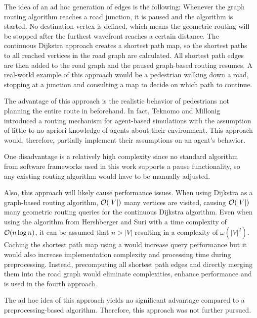 		The idea of an ad hoc generation of edges is the following:
		Whenever the graph routing algorithm reaches a road junction, it is paused and the  algorithm is started.
		No destination vertex is defined, which means the geometric routing will be stopped after the furthest wavefront reaches a certain distance.
		The continuous Dijkstra approach creates a shortest path map, so the shortest paths to all reached vertices in the road graph are calculated.
		All shortest path edges are then added to the road graph and the paused graph-based routing resumes.
		A real-world example of this approach would be a pedestrian walking down a road, stopping at a junction and consulting a map to decide on which path to continue.
		
		The advantage of this approach is the realistic behavior of pedestrians not planning the entire route in beforehand.
		In fact, Teknomo and Millonig introduced a routing mechanism for agent-based simulations with the assumption of little to no apriori knowledge of agents about their environment\cite{teknomo-millonig-routing}.
		This approach would, therefore, partially implement their assumptions on an agent's behavior.
		
		One disadvantage is a relatively high complexity since no standard algorithm from software frameworks used in this work supports a pause functionality, so any existing routing algorithm would have to be manually adjusted.

		Also, this approach will likely cause performance issues.
		When using Dijkstra as a graph-based routing algorithm, $\mathcal{O}(|V|)$ many vertices are visited, causing $\mathcal{O}(|V|)$ many geometric routing queries for the continuous Dijkstra algorithm.
		Even when using the algorithm from Hershberger and Suri\cite{hershberger-suri} with a time complexity of $\mathcal{O}(n \log n)$, it can be assumed that $n > |V|$ resulting in a complexity of $\omega(|V|^2)$.
		Caching the shortest path map using a  would increase query performance but it would also increase implementation complexity and processing time during preprocessing.
		Instead, precomputing all shortest path edges and directly merging them into the road graph would eliminate complexities, enhance performance and is used in the fourth approach.
		
		The ad hoc idea of this approach yields no significant advantage compared to a preprocessing-based algorithm.
		Therefore, this approach was not further pursued.
	
